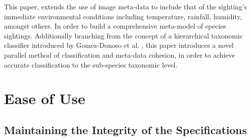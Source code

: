 \documentclass[conference]{IEEEtran}
\begin{document}
    This paper, extends the use of image meta-data to include that of the sighting's immediate environmental conditions including temperature, rainfall, humidity, amongst others. In order to build a comprehensive meta-model of species sightings. Additionally branching from the concept of a hierarchical taxonomic classifier introduced by Gomez-Donoso et al. \cite{gomez-donoso_escalona_pérez-esteve_cazorla_2021}, this paper introduces a novel parallel method of classification and meta-data cohesion, in order to achieve accurate classification to the sub-species taxonomic level.
    
    
    

\section{Ease of Use}

\subsection{Maintaining the Integrity of the Specifications}





\end{document}
